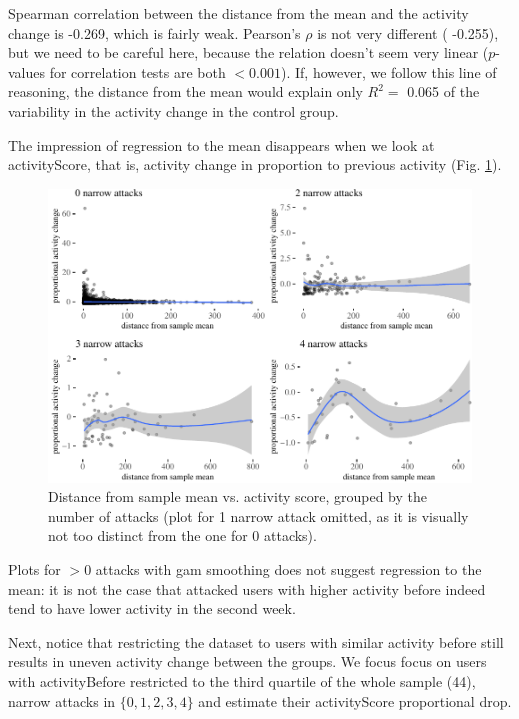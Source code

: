 \documentclass[a4paper,fleqn]{cas-dc}
\begin{document}
Spearman correlation between the distance from the mean and the activity
change is -0.269, which is fairly weak. Pearson's \(\rho\) is not very
different ( -0.255), but we need to be careful here, because the
relation doesn't seem very linear (\(p\)-values for correlation tests
are both \(<0.001\)). If, however, we follow this line of reasoning, the
distance from the mean would explain only \(R^2 =\) 0.065 of the
variability in the activity change in the control group.

The impression of regression to the mean disappears when we look at
\textsf{activityScore}, that is, activity change in proportion to
previous activity (Fig. \ref{fig:regression2}).

\begin{figure}

\begin{center}
\includegraphics[width=1\linewidth]{images/distance-1} \end{center}
\caption{Distance from sample mean vs. activity score, grouped by the number of attacks (plot for 1 narrow attack omitted, as it is visually not too distinct from the one for 0 attacks).}
\label{fig:regression2}
\end{figure}

Plots for \(>0\) attacks with gam smoothing does not suggest regression
to the mean: it is not the case that attacked users with higher activity
before indeed tend to have lower activity in the second week.

Next, notice that restricting the dataset to users with similar activity
before still results in uneven activity change between the groups. We
focus focus on users with \textsf{activityBefore} restricted to the
third quartile of the whole sample (44), narrow attacks in $\{0,1,2,3,
4\}$ and estimate their \textsf{activityScore} proportional drop.
\end{document}
